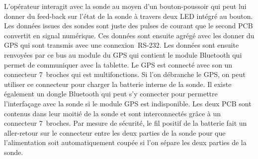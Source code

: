 L'opérateur interagit avec la sonde au moyen d'un bouton-poussoir qui peut lui donner du feed-back sur l'état de la sonde à travers deux LED intégré au bouton. Les données issues des sondes sont juste des pulses de courant que le second PCB convertit en signal numérique. Ces données sont ensuite agrégé avec les donner du GPS qui sont transmis avec une connexion~RS-232. Les données sont ensuite renvoyées par ce bus au module du GPS qui contient le module Bluetooth qui permet de communiquer avec la tablette. Le GPS est connecté avec son un connecteur 7~broches qui est multifonctions. Si l’on débranche le GPS, on peut utiliser ce connecteur pour charger la batterie interne de la sonde. Il existe également un dongle Bluetooth qui peut s’y connecter pour permettre l'interfaçage avec la sonde si le module GPS est indisponible. Les deux PCB sont contenus dans leur moitié de la sonde et sont interconnectés grâce à un connecteur 7~broches. Par mesure de sécurité, le fil positif de la batterie fait un aller-retour sur le connecteur entre les deux parties de la sonde pour que l'alimentation soit automatiquement coupée si l’on sépare les deux parties de la sonde.